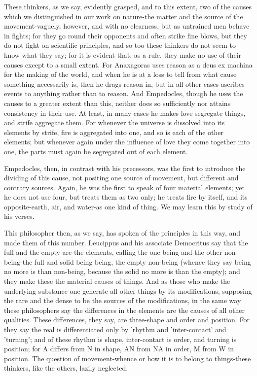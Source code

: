 \documentclass[oneside, 17pt, dvipsnames]{extbook}
\begin{document}
These thinkers, as we say, evidently grasped, and to this extent, two of the causes which we distinguished in our work on nature-the matter and the source of the movement-vaguely, however, and with no clearness, but as untrained men behave in fights; for they go round their opponents and often strike fine blows, but they do not fight on scientific principles, and so too these thinkers do not seem to know what they say; for it is evident that, as a rule, they make no use of their causes except to a small extent. For Anaxagoras uses reason as a deus ex machina for the making of the world, and when he is at a loss to tell from what cause something necessarily is, then he drags reason in, but in all other cases ascribes events to anything rather than to reason. And Empedocles, though he uses the causes to a greater extent than this, neither does so sufficiently nor attains consistency in their use. At least, in many cases he makes love segregate things, and strife aggregate them. For whenever the universe is dissolved into its elements by strife, fire is aggregated into one, and so is each of the other elements; but whenever again under the influence of love they come together into one, the parts must again be segregated out of each element.

Empedocles, then, in contrast with his precessors, was the first to introduce the dividing of this cause, not positing one source of movement, but different and contrary sources. Again, he was the first to speak of four material elements; yet he does not use four, but treats them as two only; he treats fire by itself, and its opposite-earth, air, and water-as one kind of thing. We may learn this by study of his verses.

This philosopher then, as we say, has spoken of the principles in this way, and made them of this number. Leucippus and his associate Democritus say that the full and the empty are the elements, calling the one being and the other non-being-the full and solid being being, the empty non-being (whence they say being no more is than non-being, because the solid no more is than the empty); and they make these the material causes of things. And as those who make the underlying substance one generate all other things by its modifications, supposing the rare and the dense to be the sources of the modifications, in the same way these philosophers say the differences in the elements are the causes of all other qualities. These differences, they say, are three-shape and order and position. For they say the real is differentiated only by 'rhythm and 'inter-contact' and 'turning'; and of these rhythm is shape, inter-contact is order, and turning is position; for A differs from N in shape, AN from NA in order, M from W in position. The question of movement-whence or how it is to belong to things-these thinkers, like the others, lazily neglected.
\end{document}
